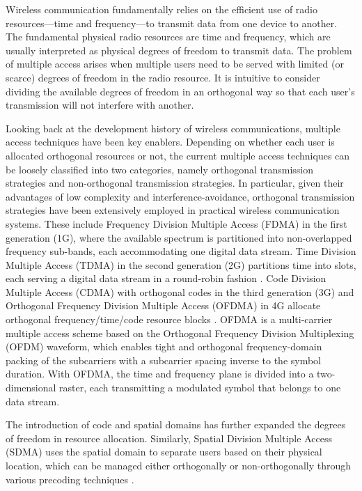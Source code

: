 Wireless communication fundamentally relies on the efficient use of radio resources—time and frequency—to transmit data from one device to another. The fundamental physical radio resources are time and frequency, which are usually interpreted as physical degrees of freedom to transmit data. The problem of multiple access arises when multiple users need to be served with limited (or scarce) degrees of freedom in the radio resource. It is intuitive to consider dividing the available degrees of freedom in an orthogonal way so that each user’s transmission will not interfere with another.

Looking back at the development history of wireless communications, multiple access techniques have been key enablers. Depending on whether each user is allocated orthogonal resources or not, the current multiple access techniques can be loosely classified into two categories, namely orthogonal transmission strategies and non-orthogonal transmission strategies. In particular, given their advantages of low complexity and interference-avoidance, orthogonal transmission strategies have been extensively employed in practical wireless communication systems. These include Frequency Division Multiple Access (FDMA) in the first generation (1G), where the available spectrum is partitioned into non-overlapped frequency sub-bands, each accommodating one digital data stream. Time Division Multiple Access (TDMA) in the second generation (2G) partitions time into slots, each serving a digital data stream in a round-robin fashion \cite{noma1}. Code Division Multiple Access (CDMA) with orthogonal codes in the third generation (3G) and Orthogonal Frequency Division Multiple Access (OFDMA) in 4G allocate orthogonal frequency/time/code resource blocks \cite{noma2}. OFDMA is a multi-carrier multiple access scheme based on the Orthogonal Frequency Division Multiplexing (OFDM) waveform, which enables tight and orthogonal frequency-domain packing of the subcarriers with a subcarrier spacing inverse to the symbol duration. With OFDMA, the time and frequency plane is divided into a two-dimensional raster, each transmitting a modulated symbol that belongs to one data stream.

The introduction of code and spatial domains has further expanded the degrees of freedom in resource allocation. Similarly, Spatial Division Multiple Access (SDMA) uses the spatial domain to separate users based on their physical location, which can be managed either orthogonally or non-orthogonally through various precoding techniques \cite{kizilirmak2016noma}.

